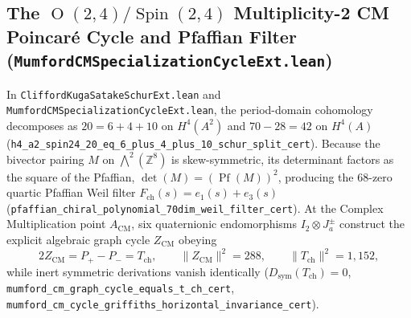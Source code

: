\documentclass[11pt,a4paper]{article}
\begin{document}
\subsection{The $\operatorname{O}(2,4)/\operatorname{Spin}(2,4)$ Multiplicity-2 CM Poincar\'e Cycle and Pfaffian Filter (\texttt{Mumford\allowbreak{}CM\allowbreak{}Specialization\allowbreak{}Cycle\allowbreak{}Ext.lean})}
In \texttt{Clifford\allowbreak{}Kuga\allowbreak{}Satake\allowbreak{}Schur\allowbreak{}Ext.lean} and \texttt{Mumford\allowbreak{}CM\allowbreak{}Specialization\allowbreak{}Cycle\allowbreak{}Ext.lean}, the period-domain cohomology decomposes as $20 = 6 + 4 + 10$ on $H^4(A^2)$ and $70 - 28 = 42$ on $H^4(A)$ (\texttt{h4\_\allowbreak{}a2\_\allowbreak{}spin24\_\allowbreak{}20\_\allowbreak{}eq\_\allowbreak{}6\_\allowbreak{}plus\_\allowbreak{}4\_\allowbreak{}plus\_\allowbreak{}10\_\allowbreak{}schur\_\allowbreak{}split\_\allowbreak{}cert}). Because the bivector pairing $M$ on $\bigwedge^2(\mathbb{Z}^8)$ is skew-symmetric, its determinant factors as the square of the Pfaffian, $\det(M) = (\operatorname{Pf}(M))^2$, producing the $68$-zero quartic Pfaffian Weil filter $F_{\mathrm{ch}}(s) = e_1(s) + e_3(s)$ (\texttt{pfaffian\_\allowbreak{}chiral\_\allowbreak{}polynomial\_\allowbreak{}70dim\_\allowbreak{}weil\_\allowbreak{}filter\_\allowbreak{}cert}). At the Complex Multiplication point $A_{\mathrm{CM}}$, six quaternionic endomorphisms $I_2 \otimes J_a^\pm$ construct the explicit algebraic graph cycle $Z_{\mathrm{CM}}$ obeying
\[
  2 Z_{\mathrm{CM}} = P_+ - P_- = T_{\mathrm{ch}}, \qquad \|Z_{\mathrm{CM}}\|^2 = 288, \qquad \|T_{\mathrm{ch}}\|^2 = 1{,}152,
\]
while inert symmetric derivations vanish identically ($D_{\mathrm{sym}}(T_{\mathrm{ch}}) = 0$, \texttt{mumford\_\allowbreak{}cm\_\allowbreak{}graph\_\allowbreak{}cycle\_\allowbreak{}equals\_\allowbreak{}t\_\allowbreak{}ch\_\allowbreak{}cert}, \texttt{mumford\_\allowbreak{}cm\_\allowbreak{}cycle\_\allowbreak{}griffiths\_\allowbreak{}horizontal\_\allowbreak{}invariance\_\allowbreak{}cert}).
\end{document}
